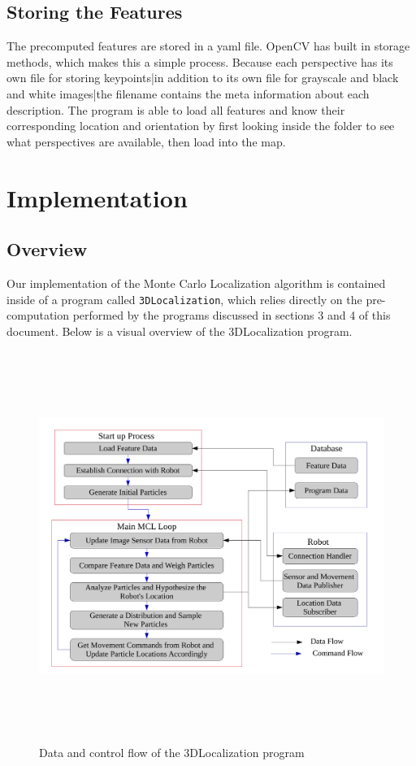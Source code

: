 \documentclass[a4paper,11pt]{article}
\begin{document}
  \subsection{Storing the Features}
The precomputed features are stored in a yaml file. OpenCV has built in storage methods, which makes this a simple process. Because each perspective has its own file for storing keypoints|in addition to its own file for grayscale and black and white images|the filename contains the meta information about each description. The program is able to load all features and know their corresponding location and orientation by first looking inside the folder to see what perspectives are available, then load into the map.

\newpage
  \section{Implementation}

 \subsection{Overview}
 Our implementation of the Monte Carlo Localization algorithm is contained inside of a program called \texttt{3DLocalization}, which relies directly on the pre-computation performed by the programs discussed in sections 3 and 4 of this document. 
  Below is a visual overview of the 3DLocalization program.
  \begin{figure}[h!]
   \centering
     \includegraphics[height=5in,width=7in,angle=0]{../Artifacts/FlowChart}
 \caption{Data and control flow of the 3DLocalization program}
\end{figure}
\end{document}
